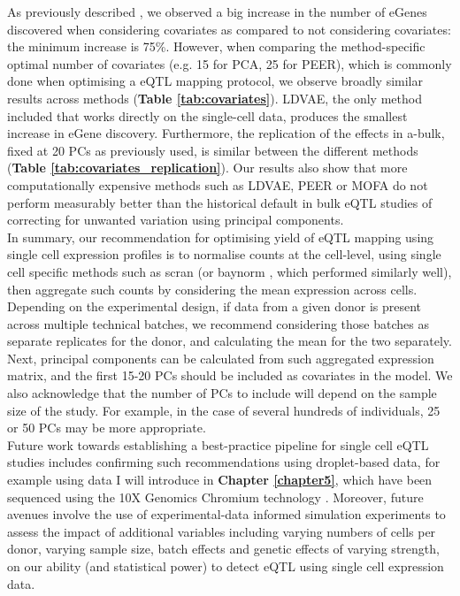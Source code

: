 As previously described \cite{stegle2012using}, we observed a big increase in the number of eGenes discovered when considering covariates as compared to not considering covariates: the minimum increase is 75\%. 
However, when comparing the method-specific optimal number of covariates (e.g. 15 for PCA, 25 for PEER), which is commonly done when optimising a eQTL mapping protocol, we observe broadly similar results across methods (\textbf{Table \ref{tab:covariates}}).
LDVAE, the only method included that works directly on the single-cell data, produces the smallest increase in eGene discovery. 
Furthermore, the replication of the effects in a-bulk, fixed at 20 PCs as previously used, is similar between the different methods (\textbf{Table \ref{tab:covariates_replication}}). 
Our results also show that more computationally expensive methods such as LDVAE, PEER or MOFA do not perform measurably better than the historical default in bulk eQTL studies of correcting for unwanted variation using principal components. \\

In summary, our recommendation for optimising yield of eQTL mapping using single cell expression profiles is to normalise counts at the cell-level, using single cell specific methods such as scran \cite{lun2016step} (or baynorm \cite{tang2020baynorm}, which performed similarly well), then aggregate such counts by considering the mean expression across cells.
Depending on the experimental design, if data from a given donor is present across multiple technical batches, we recommend considering those batches as separate replicates for the donor, and calculating the mean for the two separately.
Next, principal components can be calculated from such aggregated expression matrix, and the first 15-20 PCs should be included as covariates in the model.
We also acknowledge that the number of PCs to include will depend on the sample size of the study.
For example, in the case of several hundreds of individuals, 25 or 50 PCs may be more appropriate. \\

Future work towards establishing a best-practice pipeline for single cell eQTL studies includes confirming such recommendations using droplet-based data, for example using data I will introduce in \textbf{Chapter \ref{chapter5}}, which have been sequenced using the 10X Genomics Chromium technology \cite{zheng2017massively}. 
Moreover, future avenues involve the use of experimental-data informed simulation experiments to assess the impact of additional variables including varying numbers of cells per donor, varying sample size, batch effects and genetic effects of varying strength, on our ability (and statistical power) to detect eQTL using single cell expression data.


